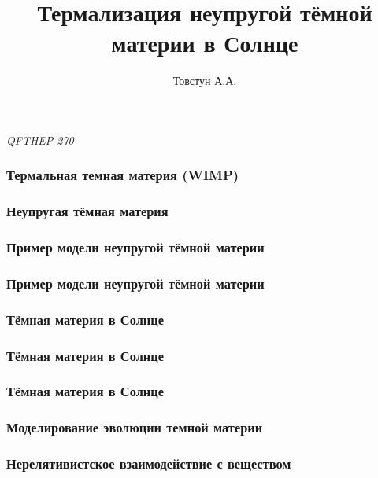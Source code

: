 


\title{Термализация неупругой тёмной материи в Солнце} 
\author[]{Товстун А.А.}

	
	\begin{frame}
		\titlepage %
		{
			\centering
			\textit{QFTHEP-270} \\
			\par
		}
	\end{frame}
	
%		
	
	\begin{frame}
		\frametitle{Термальная темная материя (WIMP)}
		
	\end{frame}
	
	\begin{frame}
		\frametitle{Неупругая тёмная материя}
		
	\end{frame}
	
	\begin{frame}
		\frametitle{Пример модели неупругой тёмной материи}
		
	\end{frame}
	
	\begin{frame}
		\frametitle{Пример модели неупругой тёмной материи}
		
	\end{frame}
	
	
	\begin{frame}
		\frametitle{Тёмная материя в Солнце}
		
	\end{frame}
	
	\begin{frame}
		\frametitle{Тёмная материя в Солнце}
		
	\end{frame}
	
	\begin{frame}
		\frametitle{Тёмная материя в Солнце}
		
	\end{frame}

	
	\begin{frame}
	\frametitle{Моделирование эволюции темной материи}
	
	\end{frame}
	
	\begin{frame}
		\frametitle{Нерелятивистское взаимодействие с веществом}
		
	\end{frame}
	
